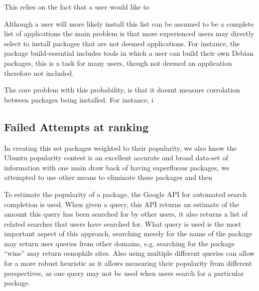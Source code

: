 This relies on the fact that a user would like to 

Although a user will more likely install this list can be assumed to be a complete list of applications 
the main problem is that more experienced users may directly select to install packages that are not deemed applications.
For instance, the package build-essential includes tools in which a user can build their own Debian packages,
this is a task for many users, though not deemed an application therefore not included.

The core problem with this probability, is that it doesnt measure corrolation between packages being installed.
For instance, i


\subsection{Failed Attempts at ranking}
In creating this set packages weighted to their popularity, we also  know the Ubuntu popularity contest is an excellent accurate and broad data-set of information with one main draw back of having superfluous packages,
we attempted to use other means to eliminate these packages and then  

To estimate the popularity of a package, the Google API for automated search completion is used.
When given a query, this API returns an estimate of the amount this query has been searched for by other users,
it also returns a list of related searches that users have searched for.
What query is used is the most important aspect of this approach,
searching merely for the name of the package may return user queries from other domains, e.g. searching for the package ``wine'' may return oenophile sites.
Also using multiple different queries can allow for a more robust heuristic as it allows measuring their popularity from different perspectives,
as one query may not be used when users search for a particular package.

